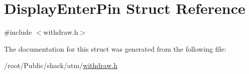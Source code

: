 \hypertarget{structDisplayEnterPin}{\section{Display\-Enter\-Pin Struct Reference}
\label{structDisplayEnterPin}
}


{\ttfamily \#include $<$withdraw.\-h$>$}



The documentation for this struct was generated from the following file\-:\begin{DoxyCompactItemize}
\item 
/root/\-Public/shack/atm/\hyperlink{withdraw_8h}{withdraw.\-h}\end{DoxyCompactItemize}
